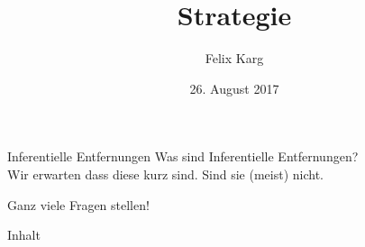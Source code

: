 \documentclass[12pt,compress,ngerman,utf8,t]{beamer}
\date{26. August 2017}
\institute{Student of Rationality}
\title{Strategie}
\author{Felix Karg}
\begin{document}
\begin{frame}[c]{Inferentielle Entfernungen}
    \large
    Was sind Inferentielle Entfernungen? \\ \pause
    Wir erwarten dass diese kurz sind. Sind sie (meist) nicht.
\end{frame}


\begin{frame}[standout]
    Ganz viele Fragen stellen!
\end{frame}


\maketitle



\begin{frame}{Inhalt}
    \small
    \begin{multicols}{2}
        \small
        \tableofcontents[hidesubsections]
    \end{multicols}
    \clearpage
\end{frame}










\end{document}
